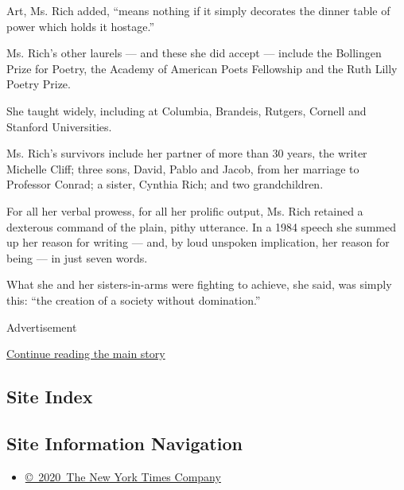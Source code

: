 Art, Ms. Rich added, ``means nothing if it simply decorates the dinner
table of power which holds it hostage.''

Ms. Rich's other laurels --- and these she did accept --- include the
Bollingen Prize for Poetry, the Academy of American Poets Fellowship and
the Ruth Lilly Poetry Prize.

She taught widely, including at Columbia, Brandeis, Rutgers, Cornell and
Stanford Universities.

Ms. Rich's survivors include her partner of more than 30 years, the
writer Michelle Cliff; three sons, David, Pablo and Jacob, from her
marriage to Professor Conrad; a sister, Cynthia Rich; and two
grandchildren.

For all her verbal prowess, for all her prolific output, Ms. Rich
retained a dexterous command of the plain, pithy utterance. In a 1984
speech she summed up her reason for writing --- and, by loud unspoken
implication, her reason for being --- in just seven words.

What she and her sisters-in-arms were fighting to achieve, she said, was
simply this: ``the creation of a society without domination.''

Advertisement

\protect\hyperlink{after-bottom}{Continue reading the main story}

\hypertarget{site-index}{%
\subsection{Site Index}\label{site-index}}

\hypertarget{site-information-navigation}{%
\subsection{Site Information
Navigation}\label{site-information-navigation}}

\begin{itemize}
\tightlist
\item
  \href{https://help.nytimes3xbfgragh.onion/hc/en-us/articles/115014792127-Copyright-notice}{©~2020~The
  New York Times Company}
\end{itemize}

